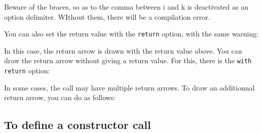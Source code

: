 \documentclass[a4paper,11pt]{report}
\begin{document}
\medskip

\begin{remark}
Beware of the braces, so as to the comma between i and k is deactivated as an option delimiter. WIthout them, there will be a compilation error.
\end{remark}

\medskip

You can also set the return value with the {\tt return} option, with the same warning:

\medskip

\begin{minipage}{0.5\textwidth}

\end{minipage}
\begin{minipage}{0.5\textwidth}
\begin{center}
\end{center}
\end{minipage}

\medskip

In this case, the return arrow is drawn with the return value above. You can draw the return arrow without giving a return value. For this, there is the {\tt with return} option:

\medskip

\begin{minipage}{0.5\textwidth}

\end{minipage}
\begin{minipage}{0.5\textwidth}
\begin{center}
\end{center}
\end{minipage}

\medskip

In some cases, the call may have multiple return arrows. To draw an additionnal return arrow, you can do as follows:

\medskip

\begin{minipage}{0.5\textwidth}

\end{minipage}
\begin{minipage}{0.5\textwidth}
\begin{center}
\end{center}
\end{minipage}

\subsection{To define a constructor call}\label{ss.create}
\end{document}
